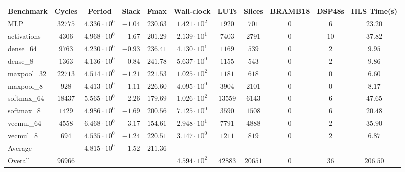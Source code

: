 \begin{tabular}{|l|c|c|c|c|c|c|c|c|c|c|}
\hline
Benchmark   & Cycles    & Period                 & Slack     & Fmax       & Wall-clock             & LUTs      & Slices    & BRAMB18 & DSP48s & HLS Time(s) \\
\hline
MLP         & $ 32775 $ & $ 4.336 \cdot 10^{0} $ & $ -1.04 $ & $ 230.63 $ & $ 1.421 \cdot 10^{2} $ & $ 1920  $ & $ 701   $ & $ 0   $ & $ 6  $ & $ 23.20   $ \\
activations & $ 4306  $ & $ 4.968 \cdot 10^{0} $ & $ -1.67 $ & $ 201.29 $ & $ 2.139 \cdot 10^{1} $ & $ 7403  $ & $ 2791  $ & $ 0   $ & $ 10 $ & $ 37.82   $ \\
dense\_64   & $ 9763  $ & $ 4.230 \cdot 10^{0} $ & $ -0.93 $ & $ 236.41 $ & $ 4.130 \cdot 10^{1} $ & $ 1169  $ & $ 539   $ & $ 0   $ & $ 2  $ & $ 9.95    $ \\
dense\_8    & $ 1363  $ & $ 4.136 \cdot 10^{0} $ & $ -0.84 $ & $ 241.78 $ & $ 5.637 \cdot 10^{0} $ & $ 1155  $ & $ 543   $ & $ 0   $ & $ 2  $ & $ 9.86    $ \\
maxpool\_32 & $ 22713 $ & $ 4.514 \cdot 10^{0} $ & $ -1.21 $ & $ 221.53 $ & $ 1.025 \cdot 10^{2} $ & $ 1181  $ & $ 618   $ & $ 0   $ & $ 0  $ & $ 6.60    $ \\
maxpool\_8  & $ 928   $ & $ 4.413 \cdot 10^{0} $ & $ -1.11 $ & $ 226.60 $ & $ 4.095 \cdot 10^{0} $ & $ 3904  $ & $ 2101  $ & $ 0   $ & $ 0  $ & $ 8.17    $ \\
softmax\_64 & $ 18437 $ & $ 5.565 \cdot 10^{0} $ & $ -2.26 $ & $ 179.69 $ & $ 1.026 \cdot 10^{2} $ & $ 13559 $ & $ 6143  $ & $ 0   $ & $ 6  $ & $ 47.65   $ \\
softmax\_8  & $ 1429  $ & $ 4.986 \cdot 10^{0} $ & $ -1.69 $ & $ 200.56 $ & $ 7.125 \cdot 10^{0} $ & $ 3590  $ & $ 1508  $ & $ 0   $ & $ 6  $ & $ 20.48   $ \\
vecmul\_64  & $ 4558  $ & $ 6.468 \cdot 10^{0} $ & $ -3.17 $ & $ 154.61 $ & $ 2.948 \cdot 10^{1} $ & $ 7791  $ & $ 4888  $ & $ 0   $ & $ 2  $ & $ 35.90   $ \\
vecmul\_8   & $ 694   $ & $ 4.535 \cdot 10^{0} $ & $ -1.24 $ & $ 220.51 $ & $ 3.147 \cdot 10^{0} $ & $ 1211  $ & $ 819   $ & $ 0   $ & $ 2  $ & $ 6.87    $ \\
\hline
Average     & $       $ & $ 4.815 \cdot 10^{0} $ & $ -1.52 $ & $ 211.36 $ & $                    $ & $       $ & $       $ & $     $ & $    $ & $         $ \\
\hline
Overall     & $ 96966 $ & $                    $ & $       $ & $        $ & $ 4.594 \cdot 10^{2} $ & $ 42883 $ & $ 20651 $ & $ 0   $ & $ 36 $ & $ 206.50  $ \\
\hline
\end{tabular}
